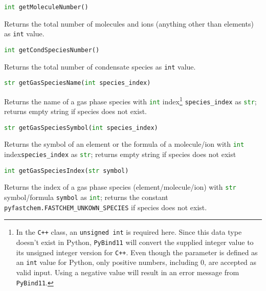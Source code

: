 \documentclass[numbers=noenddot]{aux/fcmanual}
\newcommand{\cpp}{\ttt{C++}\xspace}
\newcommand{\pb}{\texttt{PyBind11}\xspace}
\newcommand{\ttt}[1]{\texttt {#1}}
\begin{document}
\bigbreak

\lstinline[language=Python]!int getMoleculeNumber()!
\begin{addmargin}[25pt]{0pt}
	Returns the total number of molecules and ions (anything other than elements) as \lstinline!int! value.
\end{addmargin}

\bigbreak

\lstinline[language=Python]!int getCondSpeciesNumber()!
\begin{addmargin}[25pt]{0pt}
	Returns the total number of condensate species as \lstinline!int! value.
\end{addmargin}

\bigbreak

\lstinline[language=Python]!str getGasSpeciesName(int species_index)!
\begin{addmargin}[25pt]{0pt}
	Returns the name of a gas phase species with \lstinline[language=Python]!int! index\footnote{In the \cpp class, an \lstinline!unsigned int! is required here. Since this data type doesn't exist in Python, \pb will convert the supplied integer value to its unsigned integer version for \cpp. Even though the parameter is defined as an \lstinline!int! value for Python, only positive numbers, including 0, are accepted as valid input. Using a negative value will result in an error message from \pb.} \lstinline!species_index! as \lstinline[language=Python]!str!; returns empty string if species does not exist.
\end{addmargin}  

\bigbreak

\lstinline[language=Python]!str getGasSpeciesSymbol(int species_index)!
\begin{addmargin}[25pt]{0pt}
	Returns the symbol of an element or the formula of a molecule/ion with \lstinline[language=Python]!int! index\footnotemark[\value{footnote}] \lstinline!species_index! as \lstinline[language=Python]!str!; returns empty string if species does not exist
\end{addmargin}

\bigbreak

\lstinline[language=Python]!int getGasSpeciesIndex(str symbol)!
\begin{addmargin}[25pt]{0pt}
	Returns the index of a gas phase species (element/molecule/ion) with \lstinline[language=Python]!str! symbol/formula \lstinline!symbol! as \lstinline[language=Python]!int!; returns the constant \lstinline!pyfastchem.FASTCHEM_UNKOWN_SPECIES! if species does not exist.
\end{addmargin}
\end{document}
